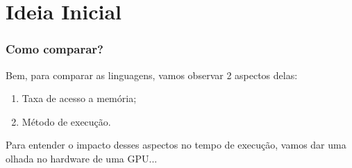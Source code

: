 \documentclass[brazil]{beamer}
\begin{document}

\section{Ideia Inicial}

\begin{frame}[fragile]
  \frametitle{Como comparar?}
  Bem, para comparar as linguagens, vamos observar 2 aspectos delas:
  \begin{enumerate}
    \item Taxa de acesso a memória;
    \item Método de execução.
  \end{enumerate}
  Para entender o impacto desses aspectos no tempo de execução, vamos dar uma olhada no hardware de uma GPU...
\end{frame}
\end{document}
